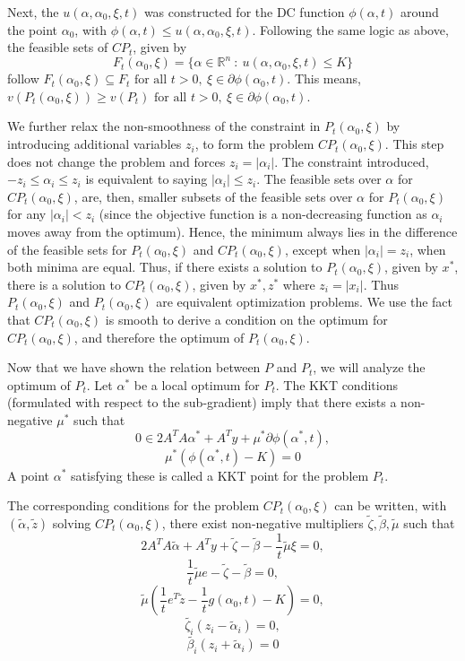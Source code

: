\documentclass[letterpaper, 10 pt, conference]{article}
\begin{document}
Next, the $u(\alpha, \alpha_0, \xi, t)$ was constructed for the DC function $\phi(\alpha, t)$ around the point $\alpha_0$, with $\phi(\alpha, t) \leq u(\alpha, \alpha_0, \xi, t)$. Following the same logic as above, the feasible sets of $CP_t$, given by $$F_t(\alpha_0, \xi) = \{ \alpha \in \mathbb{R}^n \ :\ u(\alpha, \alpha_0, \xi, t) \leq K \}$$ follow $F_t(\alpha_0, \xi) \subseteq F_t \text{ for all } t > 0,\  \xi \in \partial\phi(\alpha_0, t)$. This means, $v(P_t(\alpha_0, \xi)) \geq v(P_t)\text{ for all } t > 0,\  \xi \in \partial\phi(\alpha_0, t)$.

We further relax the non-smoothness of the constraint in $P_t(\alpha_0, \xi)$ by introducing additional variables $z_i$, to form the problem $CP_t(\alpha_0, \xi)$. This step does not change the problem and forces $z_i = |\alpha_i|$. The constraint introduced, $-z_i \leq \alpha_i \leq z_i$ is equivalent to saying $|\alpha_i| \leq z_i$. The feasible sets over $\alpha$ for $CP_t(\alpha_0, \xi)$, are, then, smaller subsets of the feasible sets over $\alpha$ for $P_t(\alpha_0, \xi)$ for any $|\alpha_i| < z_i$ (since the objective function is a non-decreasing function as $\alpha_i$ moves away from the optimum). Hence, the minimum always lies in the difference of the feasible sets for $P_t(\alpha_0, \xi)$ and $CP_t(\alpha_0, \xi)$, except when $|\alpha_i| = z_i$, when both minima are equal. Thus, if there exists a solution to $P_t(\alpha_0, \xi)$, given by $x^*$, there is a solution to $CP_t(\alpha_0, \xi)$, given by $x^*, z^*$ where $z_i = |x_i|$. Thus $P_t(\alpha_0, \xi)$ and $P_t(\alpha_0, \xi)$ are equivalent optimization problems. We use the fact that $CP_t(\alpha_0, \xi)$ is smooth to derive a condition on the optimum for $CP_t(\alpha_0, \xi)$, and therefore the optimum of $P_t(\alpha_0, \xi)$.

Now that we have shown the relation between $P$ and $P_t$, we will analyze the optimum of $P_t$. Let $\alpha^*$ be a local optimum for $P_t$. The KKT conditions (formulated with respect to the sub-gradient) imply that there exists a non-negative $\mu^*$ such that
$$0 \in 2A^TA\alpha^* + A^Ty + \mu^* \partial \phi(\alpha^*, t),$$
$$\mu^* (\phi(\alpha^*, t) - K) = 0$$
A point $\alpha^*$ satisfying these is called a KKT point for the problem $P_t$. 

The corresponding conditions for the problem $CP_t(\alpha_0, \xi)$ can be written, with $(\tilde{\alpha}, \tilde{z})$ solving $CP_t(\alpha_0, \xi)$, there exist non-negative multipliers $\tilde{\zeta}, \tilde{\beta}, \tilde{\mu}$ such that
$$2A^TA\tilde{\alpha} + A^Ty + \tilde{\zeta} - \tilde{\beta} - \frac{1}{t}\tilde{\mu}\xi = 0,$$
$$\frac{1}{t}\tilde{\mu}e - \tilde{\zeta} - \tilde{\beta} = 0,$$
$$\tilde{\mu} \left( \frac{1}{t} e^T \tilde{z} - \frac{1}{t} g(\alpha_0, t) - K \right) = 0,$$
$$\tilde{\zeta_i} (z_i - \tilde{\alpha}_i) = 0,$$
$$\tilde{\beta_i} (z_i + \tilde{\alpha}_i) = 0$$
\end{document}
